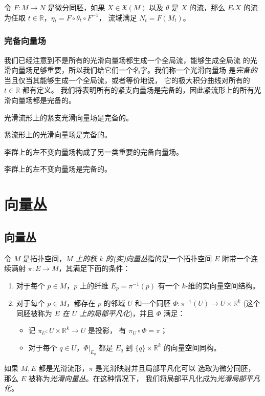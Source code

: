 \documentclass[fontset=none]{Notes}
\begin{document}
\begin{corollary}[流的微分同胚不变性]
  令 $F:M\to N$ 是微分同胚，如果 $X\in \mathfrak{X}(M)$ 以及
  $\theta$ 是 $X$ 的流，那么 $F_*X$ 的流为任取 $t\in \mathbb{R}$，$\eta_t=F\circ\theta_t\circ F^{-1}$，
  流域满足 $N_t=F(M_t)$。
\end{corollary}

\subsection{完备向量场}

我们已经注意到不是所有的光滑向量场都生成一个全局流，能够生成全局流
的光滑向量场足够重要，所以我们给它们一个名字。我们称一个光滑向量场
是\emph{完备的}当且仅当其能够生成一个全局流，或者等价地说，
它的极大积分曲线对所有的 $t\in \mathbb{R}$ 都有定义。
我们将表明所有的紧支向量场是完备的，因此紧流形上的所有光滑向量场都是完备的。


\begin{theorem}
  光滑流形上的紧支光滑向量场是完备的。
\end{theorem}

\begin{corollary}
  紧流形上的光滑向量场是完备的。
\end{corollary}

李群上的左不变向量场构成了另一类重要的完备向量场。

\begin{theorem}
  李群上的左不变向量场是完备的。
\end{theorem}




\chapter{向量丛}

\section{向量丛}

令 $M$ 是拓扑空间，\emph{$M$ 上的秩 $k$ 的(实)向量丛}指的是一个拓扑空间
$E$ 附带一个连续满射 $\pi:E\to M$，其满足下面的条件：
\begin{enumerate}
  \item 对于每个 $p\in M$，$p$ 上的纤维 $E_p=\pi^{-1}(p)$ 有一个
  $k$-维的实向量空间结构。
  \item 对于每个 $p\in M$，都存在 $p$ 的邻域 $U$ 和一个同胚
  $\varPhi:\pi^{-1}(U)\to U\times \mathbb{R}^k$ (这个同胚被称为
  \emph{$E$ 在 $U$ 上的局部平凡化})，并且 $\varPhi$ 满足：
  \begin{itemize}[nosep]
    \item 记 $\pi_U:U\times \mathbb{R}^k\to U$ 是投影，
    有 $\pi_U\circ\varPhi=\pi$；
    \item 对于每个 $q\in U$，$\varPhi|_{{E_q}}$ 都是
    $E_q$ 到 $\{q\}\times \mathbb{R}^k$ 的向量空间同构。
  \end{itemize}
\end{enumerate} 
如果 $M,E$ 都是光滑流形，$\pi$ 是光滑映射并且局部平凡化可以
选取为微分同胚，那么 $E$ 被称为\emph{光滑向量丛}。在这种情况下，
我们将局部平凡化成为\emph{光滑局部平凡化}。
\end{document}
